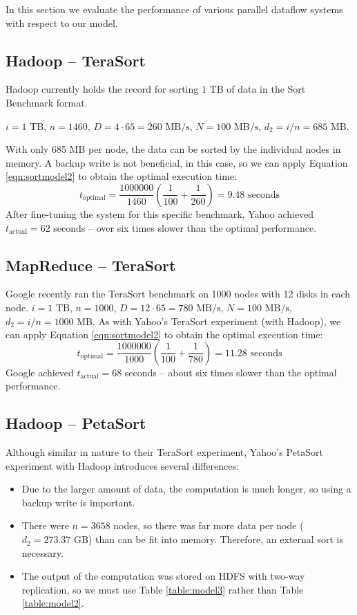 \documentclass{acm_proc_article-sp}
\begin{document}
In this section we evaluate the performance of various parallel dataflow systems with respect to our model.

\subsection{Hadoop -- TeraSort}

Hadoop currently holds the record \cite{hadoop2009} for sorting 1 TB of data in the Sort Benchmark \cite{sortbenchmark} format.

$i = 1 \text{ TB}$, $n = 1460$, $D = 4 \cdot 65 = 260 \text{ MB/s}$, $N = 100 \text{ MB/s}$, $d_2 = i/n = 685 \text{ MB}$.

With only 685 MB per node, the data can be sorted by the individual nodes in memory. A backup write is not beneficial, in this case, so we can apply Equation \ref{eqn:sortmodel2} to obtain the optimal execution time:
\[t_\text{optimal} = \frac{1000000}{1460} \left( \frac{1}{100} + \frac{1}{260} \right) = 9.48 \text{ seconds}\]
After fine-tuning the system for this specific benchmark, Yahoo achieved $t_\text{actual} = 62$ seconds -- over six times slower than the optimal performance.

\subsection{MapReduce -- TeraSort}

Google recently ran \cite{sorting1pb} the TeraSort benchmark on 1000 nodes with 12 disks in each node.
$i = 1 \text{ TB}$, $n = 1000$, $D = 12 \cdot 65 = 780 \text{ MB/s}$, $N = 100 \text{ MB/s}$, $d_2 = i/n = 1000 \text{ MB}$.
As with Yahoo's TeraSort experiment (with Hadoop), we can apply Equation \ref{eqn:sortmodel2} to obtain the optimal execution time:
\[t_\text{optimal} = \frac{1000000}{1000} \left( \frac{1}{100} + \frac{1}{780} \right) = 11.28 \text{ seconds}\]
Google achieved $t_\text{actual} = 68$ seconds -- about six times slower than the optimal performance.

\subsection{Hadoop -- PetaSort}
Although similar in nature to their TeraSort experiment, Yahoo's PetaSort experiment with Hadoop introduces several differences:
\begin{itemize}
  \item Due to the larger amount of data, the computation is much longer, so using a backup write is important.
  \item There were $n = 3658$ nodes, so there was far more data per node ($d_2 = 273.37 \text{ GB}$) than can be fit into memory. Therefore, an external sort is necessary.
  \item The output of the computation was stored on HDFS with two-way replication, so we must use Table \ref{table:model3} rather than Table \ref{table:model2}.
\end{itemize}
\end{document}
